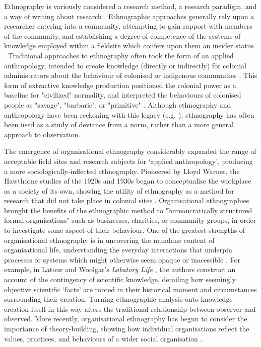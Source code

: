 Ethnography is variously considered a research method, a research paradigm, and a way of writing about research \citep{bate_whatever_1997}. Ethnographic approaches generally rely upon a researcher entering into a community, attempting to gain rapport with members of the community, and establishing a degree of competence of the systems of knowledge employed within a fieldsite which confers upon them an insider status \citep{atkinson_ethnographic_2017}.  Traditional approaches to ethnography often took the form of an applied anthropology, intended to create knowledge (directly or indirectly) for colonial administrators about the behaviour of colonised or indigenous communities \citep{baba_end_2005}.  This form of extractive knowledge production positioned the colonial power as a baseline for "civilized" normality, and interpreted the behaviours of colonised people as "savage", "barbaric", or "primitive" \citep{hsu_rethinking_1964}. Although ethnography and anthropology have been reckoning with this legacy (e.g. \citet{manning_constructing_2016}), ethnography has often been used as a study of deviance from a norm, rather than a more general approach to observation.  

The emergence of organisational ethnography considerably expanded the range of acceptable field sites and research subjects for `applied anthropology', producing a more sociologically-inflected ethnography. Pioneered by Lloyd Warner, the Hawthorne studies of the 1920s and 1930s began to conceptualise the workplace as a society of its own, showing the utility of ethnography as a method for research that did not take place in colonial sites \citep{neyland_organizational_2007}. Organisational ethnographies brought the benefits of the ethnographic method to "bureaucratically structured formal organisations" \citep{watson_making_2012} such as businesses, charities, or community groups, in order to investigate some aspect of their behaviour. One of the greatest strengths of organisational ethnography is in uncovering the mundane content of organisational life, understanding the everyday interactions that underpin processes or systems which might otherwise seem opaque or inacessible \citep{bate_whatever_1997}. For example, in Latour and Woolgar's \textit{Labatory Life} \citeyearpar{latour_laboratory_1986}, the authors construct an account of the contingency of scientific knowledge, detailing how seemingly objective scientific ‘facts’ are rooted in their historical moment and circumstances surrounding their creation. Turning ethnographic analysis onto knowledge creation itself in this way alters the traditional relationship between observer and observed. More recently, organisational ethnography has begun to consider the importance of theory-building, showing how individual organisations reflect the values, practices, and behaviours of a wider social organisation \citep{watson_making_2012}. 


